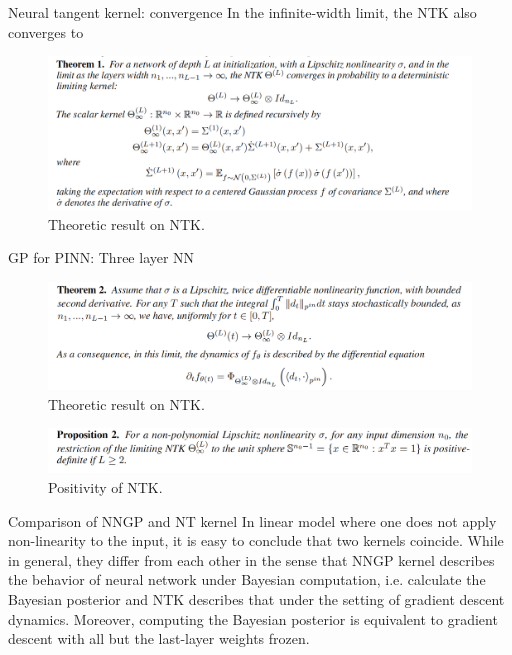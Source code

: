 \documentclass{beamer}
\begin{document}
\begin{frame}{Neural tangent kernel: convergence}
In the infinite-width limit, the NTK also converges to 
	\begin{figure}[h]
  \centering
  \centerline{\includegraphics[width=\linewidth]{NTK1.png}}
  \caption{
 Theoretic result on NTK.}
\end{figure}
\end{frame}


\begin{frame}{GP for PINN: Three layer NN}
	\begin{figure}[h]
  \centering
  \centerline{\includegraphics[width=\linewidth]{NTK2.png}}
  \caption{
 Theoretic result on NTK.}
\end{figure}
\begin{figure}[h]
  \centering
  \centerline{\includegraphics[width=\linewidth]{NTK3.png}}
  \caption{
 Positivity of NTK.}
\end{figure}
\end{frame}


\begin{frame}{Comparison of NNGP and NT kernel}
	In linear model where one does not apply non-linearity to the input, it is easy to conclude that two kernels coincide. While in general, they differ from each other in the sense that NNGP kernel describes the behavior of neural network under Bayesian computation, i.e. calculate the Bayesian posterior and NTK describes that under the setting of gradient descent dynamics. Moreover, computing the Bayesian posterior is equivalent to gradient descent with all but the last-layer weights frozen.
\end{frame}
\end{document}
